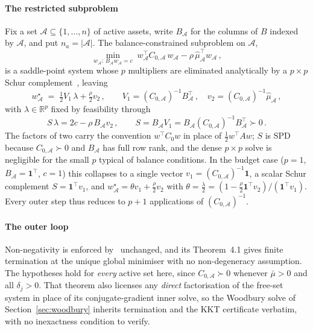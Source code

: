 \paragraph{The restricted subproblem}
Fix a set $\mathcal{A} \subseteq \{1,\ldots,n\}$ of active assets, write
$B_\mathcal{A}$ for the columns of $B$ indexed by $\mathcal{A}$, and put
$n_a = |\mathcal{A}|$. The balance-constrained subproblem on $\mathcal{A}$,
\[
  \min_{w_\mathcal{A}:\,B_\mathcal{A} w_\mathcal{A}=c}\;
  w_\mathcal{A}^\top C_{0,\mathcal{A}}\, w_\mathcal{A}
  - \rho\,\hat\mu_\mathcal{A}^\top w_\mathcal{A}\,,
\]
is a saddle-point system whose $p$ multipliers are eliminated analytically by a
$p \times p$ Schur complement~\cite[Section~3]{schmelzer2026nncg}, leaving
\[
  w^\star_\mathcal{A}
  \;=\; \tfrac12 V_1\,\lambda + \tfrac{\rho}{2} v_2\,,
  \qquad
  V_1 = (C_{0,\mathcal{A}})^{-1}B_\mathcal{A}^\top\,,
  \quad
  v_2 = (C_{0,\mathcal{A}})^{-1}\hat\mu_\mathcal{A}\,,
\]
with $\lambda \in \mathbb{R}^p$ fixed by feasibility through
\[
  S\,\lambda = 2c - \rho\,B_\mathcal{A} v_2\,,
  \qquad
  S = B_\mathcal{A} V_1 = B_\mathcal{A}(C_{0,\mathcal{A}})^{-1}B_\mathcal{A}^\top \succ 0\,.
\]
The factors of two carry the convention $w^\top C_0 w$ in place of
$\tfrac12 w^\top A w$; $S$ is SPD because $C_{0,\mathcal{A}} \succ 0$ and
$B_\mathcal{A}$ has full row rank, and the dense $p \times p$ solve is negligible
for the small $p$ typical of balance conditions. In the budget case ($p = 1$,
$B_\mathcal{A} = \mathbf{1}^\top$, $c = 1$) this collapses to a single vector
$v_1 = (C_{0,\mathcal{A}})^{-1}\mathbf{1}$, a scalar Schur complement
$S = \mathbf{1}^\top v_1$, and
$w^\star_\mathcal{A} = \theta v_1 + \tfrac{\rho}{2} v_2$ with
$\theta = \tfrac{\lambda}{2} = (1 - \tfrac{\rho}{2}\mathbf{1}^\top v_2)/(\mathbf{1}^\top v_1)$.
Every outer step thus reduces to $p+1$ applications of
$(C_{0,\mathcal{A}})^{-1}$.

\paragraph{The outer loop}
Non-negativity is enforced by~\cite[Algorithm~1]{schmelzer2026nncg} unchanged,
and its Theorem~4.1 gives finite termination at the unique global minimiser with
no non-degeneracy assumption. The hypotheses hold for \emph{every} active set
here, since $C_{0,\mathcal{A}} \succ 0$ whenever $\bar\mu > 0$ and all
$\delta_j > 0$. That theorem also licenses any \emph{direct} factorisation of the
free-set system in place of its conjugate-gradient inner solve, so the Woodbury
solve of Section~\ref{sec:woodbury} inherits termination and the KKT certificate
verbatim, with no inexactness condition to verify.


